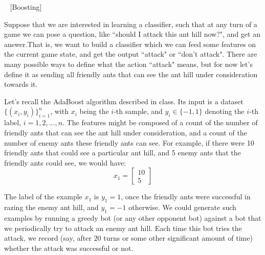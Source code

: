 \item ~ [Boosting]

Suppose that we are interested in learning a classifier, such that at any turn of a game we can pose a question, like ``should I attack this ant hill now?", and get an answer.That is, we want to build a classifier which we can feed some features on the current game state, and get the output ``attack" or ``don't attack". There are many possible ways to define what the action ``attack" means, but for now let's define it as sending all friendly ants that can see the ant hill under consideration towards it.

Let's recall the AdaBoost algorithm described in class. Its input is a dataset $\{(x_{i},y_{i})\}_{i=1}^{n}$, with $x_i$ being the $i$-th sample, and $y_{i}\in \{-1,1\}$ denoting the $i$-th label, $i=1,2,...,n$. The features might be composed of a count of the number of friendly ants that can see the ant hill under consideration, and a count of the number of enemy ants these friendly ants can see. For example, if there were 10 friendly ants that could see a particular ant hill, and 5 enemy ants that the friendly ants could see, we would have:
$$x_1 = \begin{bmatrix} 10 \\ 5 \end{bmatrix}$$

The label of the example $x_{1}$ is $y_{1} = 1$, once the friendly ants were successful in razing the enemy ant hill, and $y_{1} = -1$ otherwise. We could generate such examples by running a greedy bot (or any other opponent bot) against a bot that we periodically try to attack an enemy ant hill. Each time this bot tries the attack, we record (say, after $20$ turns or some other significant amount of time) whether the attack was successful or not.

